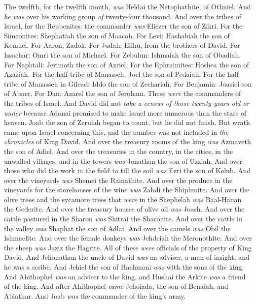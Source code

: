 \begin{biblechapter}
\verse The twelfth, for the twelfth month, \textit{was} Heldai the Netophathite, of Othniel. And \textit{he was} over his working group \textit{of} twenty-four thousand.
 And over the tribes of Israel, for the Reubenites: the commander \textit{was} Eliezer the son of Zikri. For the Simeonites: Shephatiah the son of Maacah.
\verse For Levi: Hashabiah the son of Kemuel. For Aaron, Zadok.
\verse For Judah: Elihu, from the brothers of David. For Issachar: Omri the son of Michael.
\verse For Zebulun: Ishmaiah the son of Obadiah. For Naphtali: Jerimoth the son of Azriel.
\verse For the Ephraimites: Hoshea the son of Azaziah. For the half-tribe of Manasseh: Joel the son of Pedaiah.
\verse For the half-tribe of Manasseh in Gilead: Iddo the son of Zechariah. For Benjamin: Jaasiel son of Abner.
\verse For Dan: Azarel the son of Jeroham. These \textit{were} the commanders of the tribes of Israel.
\verse And David did not \textit{take a census of those twenty years old or under} because Adonai promised to make Israel more numerous than the stars of heaven.
\verse Joab the son of Zeruiah began to count, but he did not finish. But wrath came upon Israel concerning this, and the number was not included in \textit{the chronicles} of King David.
\verse And over the treasury rooms of the king \textit{was} Azmaveth the son of Adiel. And over the treasuries in the country, in the cities, in the unwalled villages, and in the towers \textit{was} Jonathan the son of Uzziah.
\verse And over those who did the work in the field to till the soil \textit{was} Ezri the son of Kelub.
\verse And over the vineyards \textit{was} Shemei the Ramathite. And over the produce in the vineyards for the storehouses of the wine \textit{was} Zabdi the Shiphmite.
\verse And over the olive trees and the sycamore trees that \textit{were} in the Shephelah \textit{was} Baal-Hanan the Gederite. And over the treasury houses of olive oil \textit{was} Joash.
\verse And over the cattle pastured in the Sharon \textit{was} Shitrai the Sharonite. And over the cattle in the valley \textit{was} Shaphat the son of Adlai.
\verse And over the camels \textit{was} Obil the Ishmaelite. And over the female donkeys \textit{was} Jehdeiah the Meronothite. And over the sheep \textit{was} Jaziz the Hagrite.
\verse All of these \textit{were} officials of the property of King David.
\verse And Jehonathan the uncle of David \textit{was} an adviser, a man of insight, and he was a scribe. And Jehiel the son of Hachmoni \textit{was} with the sons of the king.
\verse And Ahithophel \textit{was} an adviser to the king, and Hushai the Arkite \textit{was} a friend of the king.
\verse And after Ahithophel \textit{came} Jehoiada, the son of Benaiah, and Abiathar. And Joab \textit{was} the commander of the king’s army.
\end{biblechapter}

